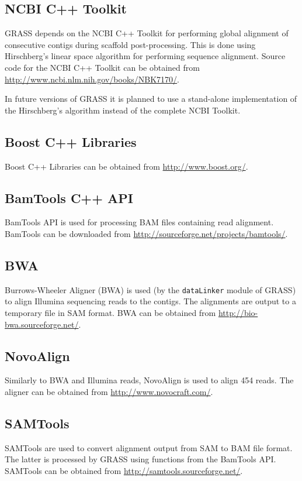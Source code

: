 \documentclass[12pt, a4paper]{report}
\begin{document}
\subsection{NCBI C++ Toolkit}
GRASS depends on the NCBI C++ Toolkit for performing global alignment of consecutive contigs during scaffold post-processing. This is done using Hirschberg's linear space algorithm for performing sequence alignment. Source code for the NCBI C++ Toolkit can be obtained from \url{http://www.ncbi.nlm.nih.gov/books/NBK7170/}.

In future versions of GRASS it is planned to use a stand-alone implementation of the Hirschberg's algorithm instead of the complete NCBI Toolkit.

\subsection{Boost C++ Libraries}
Boost C++ Libraries can be obtained from \url{http://www.boost.org/}.

\subsection{BamTools C++ API}
BamTools API is used for processing BAM files containing read alignment. BamTools can be downloaded from \url{http://sourceforge.net/projects/bamtools/}.

\subsection{BWA}
Burrows-Wheeler Aligner (BWA) is used (by the \verb=dataLinker= module of GRASS) to align Illumina sequencing reads to the contigs. The alignments are output to a temporary file in SAM format. BWA can be obtained from \url{http://bio-bwa.sourceforge.net/}.

\subsection{NovoAlign}
Similarly to BWA and Illumina reads, NovoAlign is used to align 454 reads. The aligner can be obtained from \url{http://www.novocraft.com/}.

\subsection{SAMTools}
SAMTools are used to convert alignment output from SAM to BAM file format. The latter is processed by GRASS using functions from the BamTools API. SAMTools can be obtained from \url{http://samtools.sourceforge.net/}.
\end{document}
